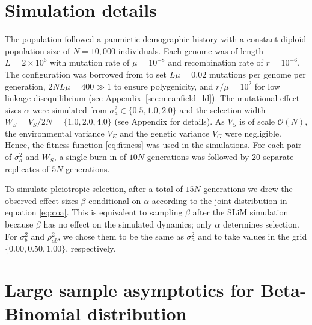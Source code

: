\documentclass[10pt]{article}
\begin{document}
\section{Simulation details}
\label{sec:simulations}
The population followed a panmictic demographic history with a constant diploid population size of $N=10{,}000$ individuals. 
Each genome was of length $L=2 \times 10^6$ with mutation rate of $\mu=10^{-8}$ and recombination rate of $r=10^{-6}$.
The configuration was borrowed from \citet{Hayward_2022} to set $L\mu=0.02$ mutations per genome per generation, $2NL\mu = 400 \gg 1$ to ensure polygenicity, and $r/\mu = 10^2$ for low linkage disequilibrium (see Appendix~\ref{sec:meanfield_ld}).
The mutational effect sizes $\alpha$ were simulated from $\sigma_a^2 \in \{0.5, 1.0, 2.0\}$ and the selection width $W_S = V_S/2N = \{1.0, 2.0, 4.0\}$ (see Appendix for details).
As $V_S$ is of scale $\mathcal{O}(N)$, the environmental variance $V_E$ and the genetic variance $V_G$ were negligible.
Hence, the fitness function \eqref{eq:fitness} was used in the simulations.
For each pair of $\sigma_a^2$ and $W_S$, 
a single burn-in of $10N$ generations was followed by 20 separate replicates of $5N$ generations.

To simulate pleiotropic selection, after a total of $15N$ generations we drew the observed effect sizes $\beta$ conditional on $\alpha$ according to the joint distribution in equation \eqref{eq:coa}.
This is equivalent to sampling $\beta$ after the SLiM simulation because $\beta$ has no effect on the simulated dynamics; only $\alpha$ determines selection.
For $\sigma_b^2$ and $\rho_{ab}^2$, we chose them to be the same as $\sigma_a^2$ and to take values in the grid $\{0.00, 0.50, 1.00\}$, respectively.

\section{Large sample asymptotics for Beta-Binomial distribution}
\label{apx:bb_large}
\end{document}
